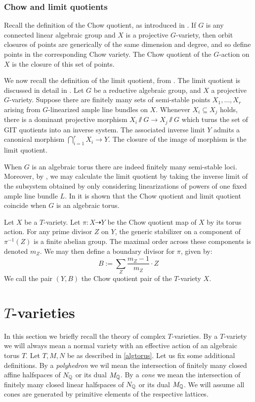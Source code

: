 \subsubsection{Chow and limit quotients}
Recall the definition of the Chow quotient, as introduced in \cite{kapranov1993}. If \(G\) is any connected linear algebraic group and \(X\) is a projective \(G\)-variety, then orbit closures of points are generically of the same dimension and degree, and so define points in the corresponding Chow variety. The Chow quotient of the \(G\)-action on \(X\) is the closure of this set of points.

We now recall the definition of the limit quotient, from \cite{mumford1994}. The limit quotient is discussed in detail in \cite{baker2012}. Let \(G\) be a reductive algebraic group, and \(X\) a projective \(G\)-variety. Suppose there are finitely many sets of semi-stable points \(X_1,\dots,X_r\) arising from \(G\)-linearized ample line bundles on \(X\).  Whenever \(X_i \subseteq X_j\) holds, there is a dominant projective morphism \(X_i \sslash G \to X_j \sslash G\) which turns the set of GIT quotients into an inverse system. The associated inverse limit \(Y\) admits a canonical morphism \(\bigcap_{i=1}^r X_i \to Y\). The closure of the image of morphism is the limit quotient.

When \(G\) is an algebraic torus there are indeed finitely many semi-stable loci. Moreover, by \cite[Corollary 2.7]{baker2012}, we may calculate the limit quotient by taking the inverse limit of the subsystem obtained by only considering linearizations of powers of one fixed ample line bundle \(L\).
%
%
%
In \cite[Proposition 2.5]{baker2012} it is shown that the Chow quotient and limit quotient coincide when \(G\) is an algebraic torus.
\begin{definition}
Let \(X\) be a \(T\)-variety. Let \(\pi:X \dashrightarrow Y\) be the Chow quotient map of \(X\) by its torus action. For any prime divisor \(Z\) on \(Y\), the generic stabilizer on a component of \(\pi^{-1}(Z)\) is a finite abelian group. The maximal order across these components is denoted \(m_Z\). We may then define a boundary divisor for \(\pi\), given by:
\begin{equation} \label{boundary}
B := \sum_Z \frac{m_Z-1}{m_Z} \cdot Z
\end{equation}
We call the pair \((Y,B)\) the Chow quotient pair of the \(T\)-variety \(X\).
\end{definition}
\section{$T$-varieties} \label{prelim:Tvar}
In this section we briefly recall the theory of complex \(T\)-varieties. By a \(T\)-variety we will always mean a normal variety with an effective action of an algebraic torus \(T\). Let \(T,M,N\) be as described in \ref{algtorus}. Let us fix some additional definitions. By a \textit{polyhedron} we wil mean the intersection of finitely many closed affine halfspaces of \(N_{\mathbb{Q}}\) or its dual \(M_{\mathbb{Q}}\). By a \textit{cone} we mean the intersection of finitely many closed linear halfspaces of \(N_{\mathbb{Q}}\) or its dual \(M_{\mathbb{Q}}\). We will assume all cones are generated by primitive elements of the respective lattices.
